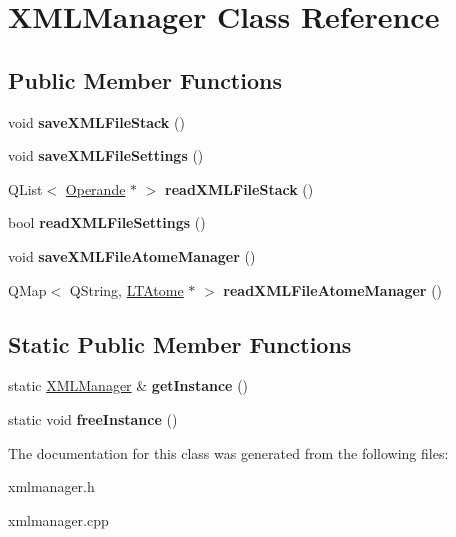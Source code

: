 \hypertarget{class_x_m_l_manager}{}\section{X\+M\+L\+Manager Class Reference}
\label{class_x_m_l_manager}
\subsection*{Public Member Functions}
\begin{DoxyCompactItemize}
\item 
void {\bfseries save\+X\+M\+L\+File\+Stack} ()\hypertarget{class_x_m_l_manager_a9674e83e101082fdb9625a7baac23e4c}{}\label{class_x_m_l_manager_a9674e83e101082fdb9625a7baac23e4c}

\item 
void {\bfseries save\+X\+M\+L\+File\+Settings} ()\hypertarget{class_x_m_l_manager_a906917e150fe738917eb406b1a098c4f}{}\label{class_x_m_l_manager_a906917e150fe738917eb406b1a098c4f}

\item 
Q\+List$<$ \hyperlink{class_operande}{Operande} $\ast$ $>$ {\bfseries read\+X\+M\+L\+File\+Stack} ()\hypertarget{class_x_m_l_manager_a5184e700d545df24ae354e20d2954dec}{}\label{class_x_m_l_manager_a5184e700d545df24ae354e20d2954dec}

\item 
bool {\bfseries read\+X\+M\+L\+File\+Settings} ()\hypertarget{class_x_m_l_manager_a62ba88c9827ebc8d7936226f13cc4d18}{}\label{class_x_m_l_manager_a62ba88c9827ebc8d7936226f13cc4d18}

\item 
void {\bfseries save\+X\+M\+L\+File\+Atome\+Manager} ()\hypertarget{class_x_m_l_manager_adcf7693c263343b8f053ce6ce97ca89d}{}\label{class_x_m_l_manager_adcf7693c263343b8f053ce6ce97ca89d}

\item 
Q\+Map$<$ Q\+String, \hyperlink{class_l_t_atome}{L\+T\+Atome} $\ast$ $>$ {\bfseries read\+X\+M\+L\+File\+Atome\+Manager} ()\hypertarget{class_x_m_l_manager_a832169bb35cee1287a27cfeabf8f7b09}{}\label{class_x_m_l_manager_a832169bb35cee1287a27cfeabf8f7b09}

\end{DoxyCompactItemize}
\subsection*{Static Public Member Functions}
\begin{DoxyCompactItemize}
\item 
static \hyperlink{class_x_m_l_manager}{X\+M\+L\+Manager} \& {\bfseries get\+Instance} ()\hypertarget{class_x_m_l_manager_ab20ae39953018edee5ea76a9dc44547c}{}\label{class_x_m_l_manager_ab20ae39953018edee5ea76a9dc44547c}

\item 
static void {\bfseries free\+Instance} ()\hypertarget{class_x_m_l_manager_ae8c014757c8d87bfec47dbd47edee6e1}{}\label{class_x_m_l_manager_ae8c014757c8d87bfec47dbd47edee6e1}

\end{DoxyCompactItemize}


The documentation for this class was generated from the following files\+:\begin{DoxyCompactItemize}
\item 
xmlmanager.\+h\item 
xmlmanager.\+cpp\end{DoxyCompactItemize}
